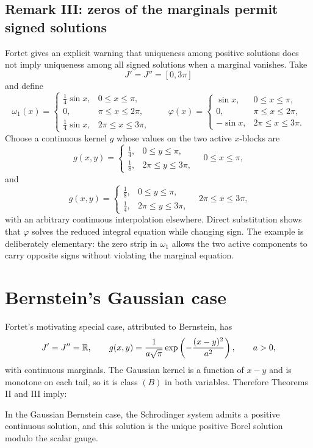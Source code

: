 \subsection*{Remark III: zeros of the marginals permit signed solutions}
Fortet gives an explicit warning that uniqueness among positive solutions does
not imply uniqueness among all signed solutions when a marginal vanishes.
Take
\[
  J'=J''=[0,3\pi]
\]
and define
\[
  \omega_1(x)=
  \begin{cases}
    \frac14\sin x,&0\le x\le\pi,\\
    0,&\pi\le x\le2\pi,\\
    \frac14\sin x,&2\pi\le x\le3\pi,
  \end{cases}
  \qquad
  \varphi(x)=
  \begin{cases}
    \sin x,&0\le x\le\pi,\\
    0,&\pi\le x\le2\pi,\\
    -\sin x,&2\pi\le x\le3\pi.
  \end{cases}
\]
Choose a continuous kernel $g$ whose values on the two active $x$-blocks are
\[
  g(x,y)=
  \begin{cases}
    \frac14,&0\le y\le\pi,\\
    \frac18,&2\pi\le y\le3\pi,
  \end{cases}
  \quad 0\le x\le\pi,
\]
and
\[
  g(x,y)=
  \begin{cases}
    \frac18,&0\le y\le\pi,\\
    \frac14,&2\pi\le y\le3\pi,
  \end{cases}
  \quad 2\pi\le x\le3\pi,
\]
with an arbitrary continuous interpolation elsewhere.  Direct substitution
shows that $\varphi$ solves the reduced integral equation while changing sign.
The example is deliberately elementary: the zero strip in $\omega_1$ allows
the two active components to carry opposite signs without violating the
marginal equation.

\section{Bernstein's Gaussian case}
Fortet's motivating special case, attributed to Bernstein, has
\[
  J'=J''=\mathbb{R},
  \qquad
  g(x,y)=\frac{1}{a\sqrt\pi}\exp\left(-\frac{(x-y)^2}{a^2}\right),
  \qquad a>0,
\]
with continuous marginals.  The Gaussian kernel is a function of $x-y$ and is monotone on each tail, so it is class $(B)$ in both variables.  Therefore Theorems II and III imply:

\begin{distilled}
In the Gaussian Bernstein case, the Schrodinger system admits a positive continuous solution, and this solution is the unique positive Borel solution modulo the scalar gauge.
\end{distilled}

